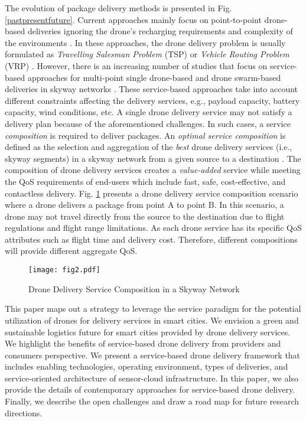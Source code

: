 \documentclass[conference]{IEEEtran}
\begin{document}
The evolution of package delivery methods is presented in Fig. \ref{pastpresentfuture}. Current approaches mainly focus on point-to-point drone-based deliveries ignoring the drone’s recharging requirements and complexity of the environments \cite{7513397}. In these approaches, the drone delivery problem is usually formulated as \textit{Travelling Salesman Problem} (TSP) \cite{8488559} or \textit{Vehicle Routing Problem} (VRP) \cite{WANG2019350}. However, there is an increasing number of studies that focus on service-based approaches for multi-point single drone-based and drone swarm-based deliveries in skyway networks \cite{alkouz2020swarm}. These service-based approaches take into account different constraints affecting the delivery services, e.g., payload capacity, battery capacity, wind conditions, etc. A single drone delivery service may not satisfy a delivery plan because of the aforementioned challenges. In such cases, a service {\em composition} is required to deliver packages. An \textit{optimal service composition} is defined as the selection and aggregation of the {\em best} drone delivery services (i.e., skyway segments) in a skyway network from a given source to a destination \cite{2021335}. The composition of drone delivery services creates a {\em value-added} service while meeting the QoS requirements of end-users which include fast, safe, cost-effective, and contactless delivery. Fig. \ref{fig2} presents a drone delivery service composition scenario where a drone delivers a package from point A to point B. In this scenario, a drone may not travel directly from the source to the destination due to flight regulations and flight range limitations. As each drone service has its specific QoS attributes such as flight time and delivery cost. Therefore, different compositions will provide different aggregate QoS.

\begin{figure} [t]
    \centering
    \texttt{[image: fig2.pdf]}
    \caption{Drone Delivery Service Composition in a Skyway Network}
    \label{fig2}
\end{figure}

This paper maps out a strategy to leverage the service paradigm for the potential utilization of drones for delivery services in smart cities. We envision a green and sustainable logistics future for smart cities provided by drone delivery services. We highlight the benefits of service-based drone delivery from providers and consumers perspective. We present a service-based drone delivery framework that includes enabling technologies, operating environment, types of deliveries, and service-oriented architecture of sensor-cloud infrastructure. In this paper, we also provide the details of contemporary approaches for service-based drone delivery. Finally, we describe the open challenges and draw a road map for future research directions.
\end{document}
